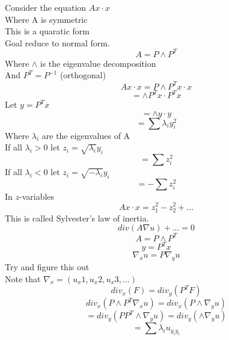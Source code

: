 \documentclass{article}
\begin{document}
Consider the equation $Ax \cdot x$ \\
Where A is symmetric\\
This is a quaratic form\\
Goal reduce to normal form.\\
$$A = P \wedge P^T$$
Where $\wedge$ is the eigenvalue decomposition\\
And $P^{T} = P^{-1}$ (orthogonal)\\
$$ Ax \cdot x = P \wedge P^T x \cdot x$$
$$ = \wedge P^{T} x \cdot P^{T} x$$
Let $y = P^{T} x$\\
$$ = \wedge y \cdot y$$
$$ = \sum \lambda_i y_i^2$$
Where $\lambda_i$ are the eigenvalues of A\\
If all $\lambda_i > 0$ let $z_i = \sqrt{\lambda_i} y_i$\\
$$ = \sum z_i^2$$
If all $\lambda_i < 0$ let $z_i = \sqrt{-\lambda_i} y_i$\\
$$ = -\sum z_i^2$$
In $z$-variables \\
$$ A x \cdot x = z_1^2 - z_2^2 + ... $$
This is called Sylvester's law of inertia.\\
$$div(A \nabla u) + ... = 0$$
$$A = P \wedge P^T$$
$$ y = P^T x$$
$$ \nabla_x u = P \nabla_y u $$
Try and figure this out\\
Note that $\nabla_x = (u_x1, u_x2, u_x3, ...)$\\
$$ div_x (F) = div_y (P^T F)$$
$$ div_x (P \wedge P^{T} \nabla_x u ) = div_x (P \wedge \nabla_y u)$$
$$ = div_y (P P^{T} \wedge \nabla_y u) = div_y(\wedge \nabla_y u)$$
$$ = \sum \lambda_i u_{y_i y_i}$$
\end{document}
